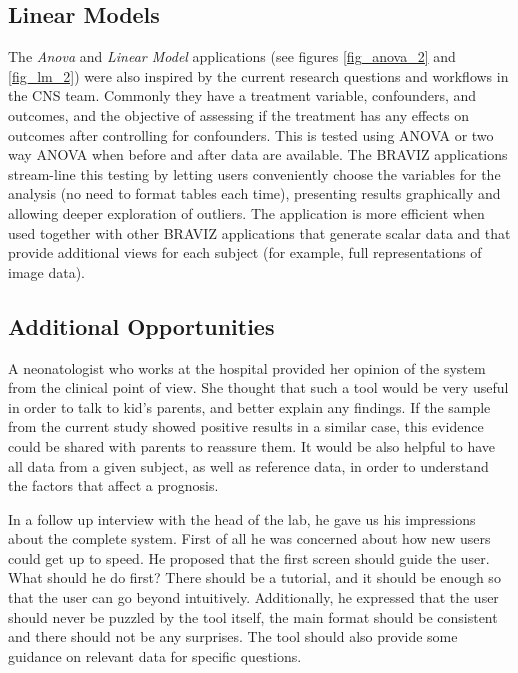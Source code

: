 \subsection{Linear Models}

The \emph{Anova} and \emph{Linear Model} applications (see figures \ref{fig_anova_2} and \ref{fig_lm_2}) were also inspired by the current research questions and workflows in the CNS team. Commonly they have a treatment variable, confounders, and outcomes, and the objective of assessing if the treatment has any effects on outcomes after controlling for confounders. This is tested using ANOVA or two way ANOVA when before and after data are available. The BRAVIZ applications stream-line this testing by letting users conveniently choose the variables for the analysis (no need to format tables each time), presenting results graphically and allowing deeper exploration of outliers. The application is more efficient when used together with other BRAVIZ applications that generate scalar data and that provide additional views for each subject (for example, full representations of image data). 

% 


\subsection{Additional Opportunities}

A neonatologist who works at the hospital provided her opinion of the system from the clinical point of view. She thought that such a tool would be very useful in order to talk to kid's parents, and better explain any findings. If the sample from the current study showed positive results in a similar case, this evidence could be shared with parents to reassure them. It would be also helpful to have all data from a given subject, as well as reference data, in order to understand the factors that affect a prognosis. 


In a follow up interview with the head of the lab, he gave us his impressions about the complete system. First of all he was concerned about how new users could get up to speed. He proposed that the first screen should guide the user. What should he do first? There should be a tutorial, and it should be enough so that the user can go beyond intuitively. Additionally, he expressed that the user should never be puzzled by the tool itself, the main format should be consistent and there should not be any surprises. The tool should also provide some guidance on relevant data for specific questions. 

